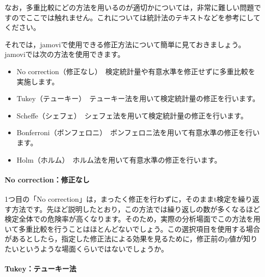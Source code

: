 \documentclass[
  12pt,
  a5jpaper,
  lualatex, ja=standard]{bxjsbook}
\providecommand{\tightlist}{%
  \setlength{\itemsep}{0pt}\setlength{\parskip}{0pt}}
\newenvironment{jmvsettings}{%
	\begin{center}%
	\begin{tcolorbox}[%
		title=設定項目,
		colframe=gmoji,
		colbacktitle=gmoji,
		colback=gmoji!2!white,
		breakable,
		width=.9\textwidth,
		]\small\addtolength{\leftmargini}{-3\labelsep}%
	}%
	{\end{tcolorbox}\end{center}}
\begin{document}
なお，多重比較にどの方法を用いるのが適切かについては，非常に難しい問題ですのでここでは触れません。これについては統計法のテキストなどを参考にしてください。

それでは，jamoviで使用できる修正方法について簡単に見ておきましょう。jamoviでは次の方法を使用できます。

\begin{jmvsettings}

\begin{itemize}
\tightlist
\item
  No correction（修正なし）　検定統計量や有意水準を修正せずに多重比較を実施します。
\item
  Tukey（テューキー）　テューキー法を用いて検定統計量の修正を行います。
\item
  Scheffe（シェフェ）　シェフェ法を用いて検定統計量の修正を行います。
\item
  Bonferroni（ボンフェロニ）　ボンフェロニ法を用いて有意水準の修正を行います。
\item
  Holm（ホルム）　ホルム法を用いて有意水準の修正を行います。
\end{itemize}

\end{jmvsettings}

\hypertarget{no-correctionux4feeux6b63ux306aux3057}{%
\paragraph*{No correction：修正なし}\label{no-correctionux4feeux6b63ux306aux3057}}

1つ目の「No correction」は，まったく修正を行わずに，そのままt検定を繰り返す方法です。先ほど説明したとおり，この方法では繰り返しの数が多くなるほど検定全体での危険率が高くなります。そのため，実際の分析場面でこの方法を用いて多重比較を行うことはほとんどないでしょう。この選択項目を使用する場合があるとしたら，指定した修正法による効果を見るために，修正前のp値が知りたいというような場面くらいではないでしょうか。

\hypertarget{tukeyux30c6ux30e5ux30fcux30adux30fcux6cd5}{%
\paragraph*{Tukey：テューキー法}\label{tukeyux30c6ux30e5ux30fcux30adux30fcux6cd5}}
\end{document}
